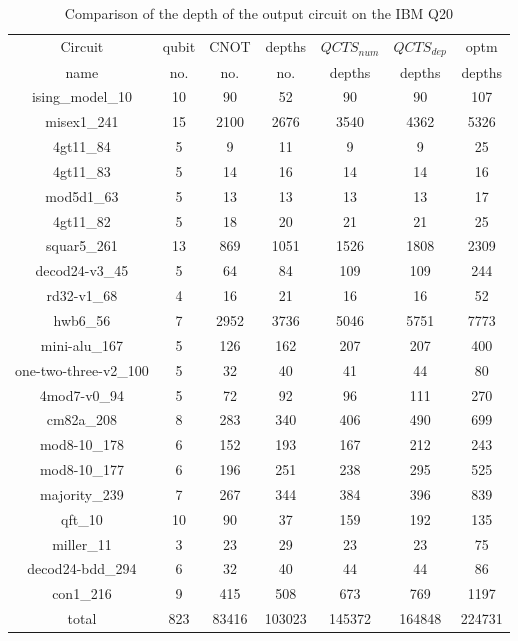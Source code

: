 \documentclass[runningheads]{llncs}
\begin{document}
							\begin{table}[H]
								\label{tab8}
								\begin{center}  
								\begin{tabular}{|c|c|c|c|c|c|c|}
								\hline
								Circuit &  qubit  & CNOT &depths &$QCTS_{num}$& $QCTS_{dep}$  & optm 	  	\\
								 name	&   no. 	&	no. & no. & depths&  depths &  depths 	\\
								\hline
								ising\_model\_10 & 10 & 90 & 52 & 90 & 90 & 107 \\
								misex1\_241 & 15 & 2100 & 2676 & 3540 & 4362 & 5326 \\
								4gt11\_84 & 5 & 9 & 11 & 9 & 9 & 25 \\
								4gt11\_83 & 5 & 14 & 16 & 14 & 14 & 16 \\
								mod5d1\_63 & 5 & 13 & 13 & 13 & 13 & 17 \\
								4gt11\_82 & 5 & 18 & 20 & 21 & 21 & 25 \\
								squar5\_261 & 13 & 869 & 1051 & 1526 & 1808 & 2309 \\
								decod24-v3\_45 & 5 & 64 & 84 & 109 & 109 & 244 \\
								rd32-v1\_68 & 4 & 16 & 21 & 16 & 16 & 52 \\
								hwb6\_56 & 7 & 2952 & 3736 & 5046 & 5751 & 7773 \\
								mini-alu\_167 & 5 & 126 & 162 & 207 & 207 & 400 \\
								one-two-three-v2\_100 & 5 & 32 & 40 & 41 & 44 & 80 \\
								4mod7-v0\_94 & 5 & 72 & 92 & 96 & 111 & 270 \\
								cm82a\_208 & 8 & 283 & 340 & 406 & 490 & 699 \\
								mod8-10\_178 & 6 & 152 & 193 & 167 & 212 & 243 \\
								mod8-10\_177 & 6 & 196 & 251 & 238 & 295 & 525 \\
								majority\_239 & 7 & 267 & 344 & 384 & 396 & 839 \\
								qft\_10 & 10 & 90 & 37 & 159 & 192 & 135 \\
								miller\_11 & 3 & 23 & 29 & 23 & 23 & 75 \\
								decod24-bdd\_294 & 6 & 32 & 40 & 44 & 44 & 86 \\
								con1\_216 & 9 & 415 & 508 & 673 & 769 & 1197 \\
								\hline
								total & 823 & 83416 & 103023 & 145372 & 164848 & 224731  \\ 
							\hline
								\end{tabular} 
								\end{center}						
								\caption{Comparison of  the depth of the output circuit on the IBM Q20} 
								\label{tab8}\end{table}
\end{document}
